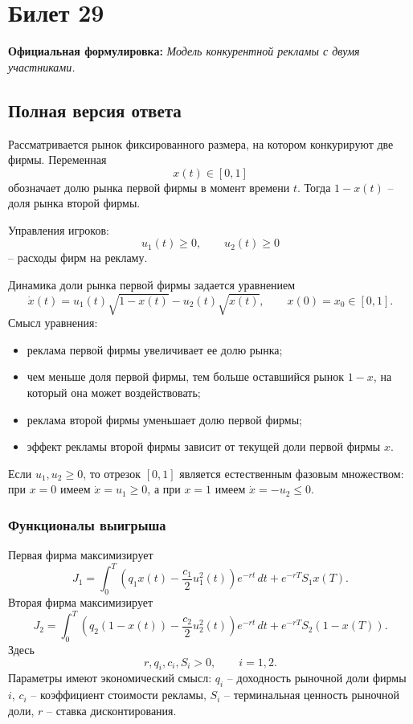 \documentclass[12pt,a4paper]{article}
\begin{document}
\newpage
\section{Билет 29}

\textbf{Официальная формулировка:} \emph{Модель конкурентной рекламы с двумя участниками.}

\subsection{Полная версия ответа}

Рассматривается рынок фиксированного размера, на котором конкурируют две фирмы. Переменная
\[
 x(t)\in[0,1]
\]
обозначает долю рынка первой фирмы в момент времени $t$. Тогда $1-x(t)$ -- доля рынка второй фирмы.

Управления игроков:
\[
 u_1(t)\ge0,
 \qquad
 u_2(t)\ge0
\]
-- расходы фирм на рекламу.

Динамика доли рынка первой фирмы задается уравнением
\[
 \dot x(t)=u_1(t)\sqrt{1-x(t)}-u_2(t)\sqrt{x(t)},\qquad x(0)=x_0\in[0,1].
\]
Смысл уравнения:
\begin{itemize}
\item реклама первой фирмы увеличивает ее долю рынка;
\item чем меньше доля первой фирмы, тем больше оставшийся рынок $1-x$, на который она может воздействовать;
\item реклама второй фирмы уменьшает долю первой фирмы;
\item эффект рекламы второй фирмы зависит от текущей доли первой фирмы $x$.
\end{itemize}

Если $u_1,u_2\ge0$, то отрезок $[0,1]$ является естественным фазовым множеством: при $x=0$ имеем $\dot x=u_1\ge0$, а при $x=1$ имеем $\dot x=-u_2\le0$.

\subsubsection{Функционалы выигрыша}

Первая фирма максимизирует
\[
 J_1=\int_0^T\left(q_1x(t)-\frac{c_1}{2}u_1^2(t)\right)e^{-rt}\,dt+e^{-rT}S_1x(T).
\]
Вторая фирма максимизирует
\[
 J_2=\int_0^T\left(q_2(1-x(t))-\frac{c_2}{2}u_2^2(t)\right)e^{-rt}\,dt+e^{-rT}S_2(1-x(T)).
\]
Здесь
\[
 r,q_i,c_i,S_i>0,
 \qquad i=1,2.
\]
Параметры имеют экономический смысл: $q_i$ -- доходность рыночной доли фирмы $i$, $c_i$ -- коэффициент стоимости рекламы, $S_i$ -- терминальная ценность рыночной доли, $r$ -- ставка дисконтирования.
\end{document}
